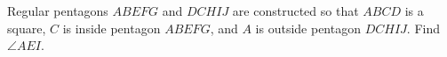 Regular pentagons $ABEFG$ and $DCHIJ$ are constructed so that $ABCD$ is a square, $C$ is inside pentagon $ABEFG$, and $A$ is outside pentagon $DCHIJ$. Find $\angle AEI$.

